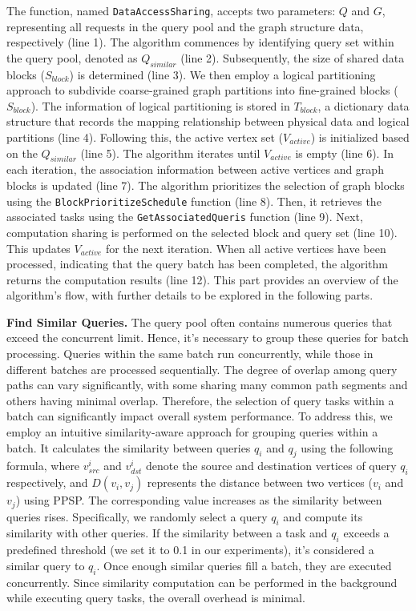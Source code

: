 \documentclass[10pt,journal,compsoc]{IEEEtran}
\begin{document}
The function, named \texttt{DataAccessSharing}, accepts two parameters: $Q$ and $G$, representing all requests in the query pool and the graph structure data, respectively (line 1). The algorithm commences by identifying  query set within the query pool, denoted as $Q_{similar}$ (line 2). Subsequently, the size of shared data blocks ($S_{block}$) is determined (line 3). We then employ a logical partitioning approach to subdivide coarse-grained graph partitions into fine-grained blocks ($S_{block}$). The information of logical partitioning is stored in $T_{block}$, a dictionary data structure that records the mapping relationship between physical data and logical partitions (line 4). Following this, the active vertex set ($V_{active}$) is initialized based on the $Q_{similar}$ (line 5). The algorithm iterates until $V_{active}$ is empty (line 6). In each iteration, the association information between active vertices and graph blocks is updated (line 7). The algorithm prioritizes the selection of graph blocks using the \texttt{BlockPrioritizeSchedule} function (line 8). Then, it retrieves the associated tasks using the \texttt{GetAssociatedQueris} function (line 9). Next, computation sharing is performed on the selected block and query set (line 10). This updates $V_{active}$ for the next iteration. When all active vertices have been processed, indicating that the query batch has been completed, the algorithm returns the computation results (line 12).
This part provides an overview of the algorithm's flow, with further details to be explored in the following parts.

{\bf{Find Similar Queries.}} The query pool often contains numerous queries that exceed the concurrent limit. Hence, it's necessary to group these queries for batch processing. Queries within the same batch run concurrently, while those in different batches are processed sequentially. The degree of overlap among query paths can vary significantly, with some sharing many common path segments and others having minimal overlap. Therefore, the selection of query tasks within a batch can significantly impact overall system performance.
To address this, we employ an intuitive similarity-aware approach for grouping queries within a batch. It calculates the similarity between queries $q_i$ and $q_j$ using the following formula, where $v_{src}^i$ and $v_{dst}^i$ denote the source and destination vertices of query $q_i$ respectively, and $D(v_i,v_j)$ represents the distance between two vertices ($v_i$ and $v_j$) using PPSP. The corresponding value increases as the similarity between queries rises. Specifically, we randomly select a query $q_i$ and compute its similarity with other queries. If the similarity between a task and $q_i$ exceeds a predefined threshold (we set it to 0.1 in our experiments), it's considered a similar query to $q_i$. Once enough similar queries fill a batch, they are executed concurrently.
Since similarity computation can be performed in the background while executing query tasks, the overall overhead is minimal.
\end{document}
